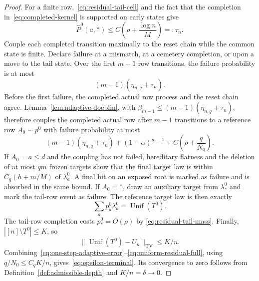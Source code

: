 \documentclass[11pt]{article}
\newcommand{\1}{\mathbf 1}
\newcommand{\TV}{\mathrm{TV}}
\newcommand{\Unif}{\operatorname{Unif}}
\theoremstyle{definition}
\theoremstyle{remark}
\begin{document}
\begin{proof}
For a finite row,~\eqref{eq:residual-tail-cell} and the fact that the
completion in~\eqref{eq:completed-kernel} is supported on early states
give
\begin{equation}\label{eq:finite-tail-probability}
  \widehat P^0(a,*)
  \leq C\left(\rho+\frac{\log n}{M}\right)=:\tau_n.
\end{equation}
Couple each completed transition maximally to the reset chain while the
common state is finite.  Declare failure at a mismatch, at a cemetery
completion, or upon a move to the tail state.  Over the first $m-1$ row
transitions, the failure probability is at most
\begin{equation}\label{eq:coupling-failure}
  (m-1)(\eta_{n,q}+\tau_n).
\end{equation}
Before the first failure, the completed actual row process and the reset
chain agree.  Lemma~\ref{lem:adaptive-doeblin}, with
$\beta_{m-1}\leq(m-1)(\eta_{n,q}+\tau_n)$, therefore couples the
completed actual row after $m-1$ transitions to a reference row
$A_0\sim p^0$ with failure probability at most
\[
 (m-1)(\eta_{n,q}+\tau_n)
 +(1-\alpha)^{m-1}
 +C\left(\rho+\frac q{N_0}\right).
\]
  If $A_0=a\leq d$ and the coupling has not failed,
hereditary flatness and the deletion of at most $qm$ frozen targets show
that the final target law is within $C_q(h+m/M)$ of $\lambda_a^0$.  A
final hit on an exposed root is marked as failure and is absorbed in the
same bound.  If $A_0=*$, draw an auxiliary target from $\lambda_*^0$ and
mark the tail-row event as failure.  The reference target law is then
exactly
\begin{equation}\label{eq:uniform-mixture}
  \sum_a p_a^0\lambda_a^0=\Unif(T^0).
\end{equation}
The tail-row completion costs $p_*^0=O(\rho)$ by
\eqref{eq:residual-tail-mass}.  Finally, $|[n]\setminus T^0|\leq K$, so
\begin{equation}\label{eq:uniform-residual-full}
  \|\Unif(T^0)-U_n\|_{\TV}\leq K/n.
\end{equation}
Combining~\eqref{eq:one-step-adaptive-error}--\eqref{eq:uniform-residual-full},
using $q/N_0\leq C_qK/n$, gives~\eqref{eq:epsilon-terminal}.  Its
convergence to zero follows from Definition~\ref{def:admissible-depth} and
$K/n=\delta\to0$.
\end{proof}
\end{document}
